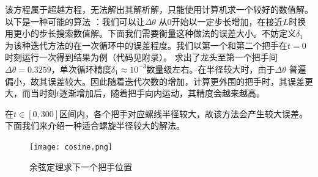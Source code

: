 \documentclass{cumcmthesis1}
\begin{document}
该方程属于超越方程，无法解出其解析解，只能使用计算机求一个较好的数值解。以下是一种可能的算法
：我们可以让$\Delta  \theta$ 从0开始以一定步长增加，在接近$L$时换用更小的步长搜索数值解。下面我们需要衡量这种做法的误差大小。不妨定义$\delta_1$
为该种迭代方法的在一次循环中的误差程度。我们以第一个和第二个把手在$t=0$时刻运行一次得到结果为例（代码见附录）。
求出了龙头至第一个把手间$\Delta \theta=0.3259$，单次循环精度$\delta_1 \approx 10^{-3}$数量级左右。在半径较大时，由于$\Delta \theta$
普遍偏小，故其误差较大。因此随着迭代次数的增加，计算更外围的把手时，其误差更大，而当时刻$t$逐渐增加后，随着把手向内运动，其精度会越来越高。
\par
在$t \in [0,300]$区间内，各个把手对应螺线半径较大，故该方法会产生较大误差。下面我们来介绍一种适合螺旋半径较大的解法。
\begin{figure}
    \caption{余弦定理求下一个把手位置}
    \centering    
    \texttt{[image: cosine.png]}
\end{figure}
\end{document}
